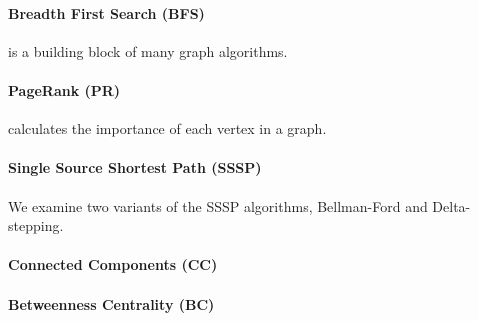 \paragraph{Breadth First Search (BFS)} is a building block of many graph algorithms.

\paragraph{PageRank (PR)} calculates the importance of each vertex in a graph. 

\paragraph*{Single Source Shortest Path (SSSP)} We examine two variants of the SSSP algorithms, Bellman-Ford and Delta-stepping.

\paragraph{Connected Components (CC)}

\paragraph{Betweenness Centrality (BC)} 